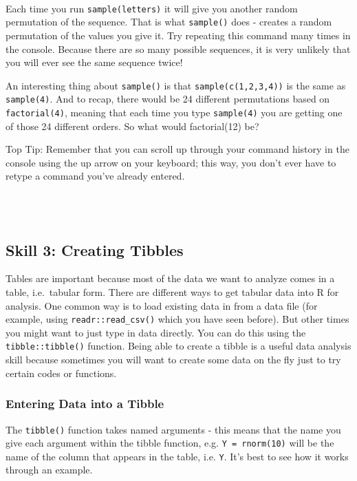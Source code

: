 \documentclass[]{book}
\newenvironment{info}
    {
    \hline\\
    }
    { 
    \\\\\hline
    }
\begin{document}
\begin{info}
Each time you run \texttt{sample(letters)} it will give you another
random permutation of the sequence. That is what \texttt{sample()} does
- creates a random permutation of the values you give it. Try repeating
this command many times in the console. Because there are so many
possible sequences, it is very unlikely that you will ever see the same
sequence twice!

An interesting thing about \texttt{sample()} is that
\texttt{sample(c(1,2,3,4))} is the same as \texttt{sample(4)}. And to
recap, there would be 24 different permutations based on
\texttt{factorial(4)}, meaning that each time you type
\texttt{sample(4)} you are getting one of those 24 different orders. So
what would factorial(12) be?

Top Tip: Remember that you can scroll up through your command history in
the console using the up arrow on your keyboard; this way, you don't
ever have to retype a command you've already entered.
\end{info}

\hypertarget{skill-3-creating-tibbles}{%
\subsection{Skill 3: Creating Tibbles}\label{skill-3-creating-tibbles}}

Tables are important because most of the data we want to analyze comes in a table, i.e.~tabular form. There are different ways to get tabular data into R for analysis. One common way is to load existing data in from a data file (for example, using \texttt{readr::read\_csv()} which you have seen before). But other times you might want to just type in data directly. You can do this using the \texttt{tibble::tibble()} function. Being able to create a tibble is a useful data analysis skill because sometimes you will want to create some data on the fly just to try certain codes or functions.

\hypertarget{entering-data-into-a-tibble}{%
\subsubsection{Entering Data into a Tibble}\label{entering-data-into-a-tibble}}

The \texttt{tibble()} function takes named arguments - this means that the name you give each argument within the tibble function, e.g. \texttt{Y\ =\ rnorm(10)} will be the name of the column that appears in the table, i.e. \texttt{Y}. It's best to see how it works through an example.
\end{document}
